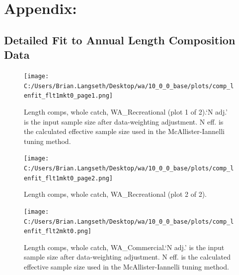 \documentclass[11pt,
  english,
  a4paper,
]{article}
\begin{document}

\hypertarget{appendix}{%
\section{Appendix:}\label{appendix}}

\leavevmode\tagmcend\tagstructend


\hypertarget{append_a}{%
\subsection{Detailed Fit to Annual Length Composition Data}\label{append_a}}

\leavevmode\tagmcend\tagstructend


\begin{figure}
\centering
\texttt{[image: C:/Users/Brian.Langseth/Desktop/wa/10\_0\_0\_base/plots/comp\_lenfit\_flt1mkt0\_page1.png]}
\caption{Length comps, whole catch, WA\_Recreational (plot 1 of 2).`N adj.' is the input sample size after data-weighting adjustment. N eff. is the calculated effective sample size used in the McAllister-Iannelli tuning method.\label{fig:comp_lenfit_flt1mkt0_page1}}
\end{figure}

\tagmcend\tagstructend


\begin{figure}
\centering
\texttt{[image: C:/Users/Brian.Langseth/Desktop/wa/10\_0\_0\_base/plots/comp\_lenfit\_flt1mkt0\_page2.png]}
\caption{Length comps, whole catch, WA\_Recreational (plot 2 of 2).\label{fig:comp_lenfit_flt1mkt0_page2}}
\end{figure}

\tagmcend\tagstructend


\begin{figure}
\centering
\texttt{[image: C:/Users/Brian.Langseth/Desktop/wa/10\_0\_0\_base/plots/comp\_lenfit\_flt2mkt0.png]}
\caption{Length comps, whole catch, WA\_Commercial.`N adj.' is the input sample size after data-weighting adjustment. N eff. is the calculated effective sample size used in the McAllister-Iannelli tuning method.\label{fig:comp_lenfit_flt2mkt0}}
\end{figure}

\tagmcend\tagstructend
\end{document}
